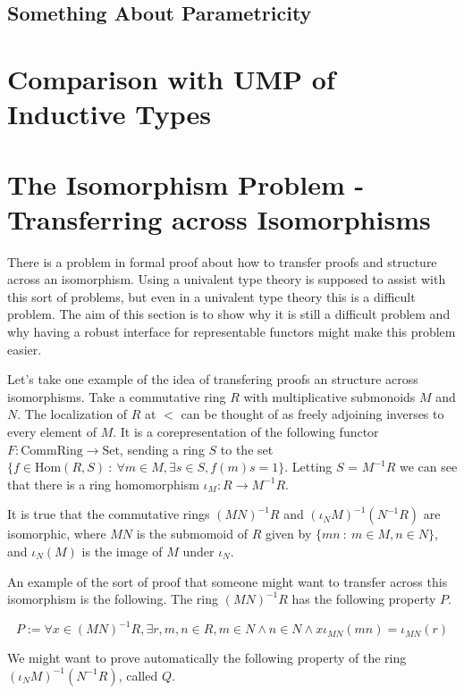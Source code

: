 \documentclass[12pt]{article} %
\theoremstyle{definition}
\theoremstyle{definition}
\theoremstyle{definition}
\theoremstyle{definition}
\begin{document}
\subsection{Something About Parametricity}

\section{Comparison with UMP of Inductive Types}

\section{The Isomorphism Problem - Transferring across Isomorphisms}

There is a problem in formal proof about how to transfer proofs and structure across an isomorphism. Using
a univalent type theory is supposed to assist with this sort of problems, but even in a univalent type theory this
is a difficult problem. The aim of this section is to show why it is still a difficult problem and why having
a robust interface for representable functors might make this problem easier.

Let's take one example of the idea of transfering proofs an structure across isomorphisms. Take a commutative
ring $R$ with multiplicative submonoids $M$ and $N$. The localization of $R$ at $<$ can be thought of as freely
adjoining inverses to every element of $M$. It is a corepresentation of the following functor
$F : \text{CommRing} \to \text{Set}$, sending a ring $S$ to the set
$\{ f \in \text{Hom}(R, S) \ : \ \forall m \in M, \exists s \in S, f(m)s = 1 \}$.
Letting $S$ = $M^{-1}R$ we can see that there is a ring homomorphism $\iota_M : R \to M^{-1}R$.

It is true that the commutative rings $(MN)^{-1}R$ and $(\iota_N M)^{-1}(N^{-1}R)$ are isomorphic,
where $MN$ is the submomoid of $R$ given by $\{ mn \ : \ m \in M, n \in N \}$, and $\iota_N(M)$ is the
image of $M$ under $\iota_N$.

An example of the sort of proof that someone might want to transfer across this isomorphism is the
following. The ring $(MN)^{-1}R$ has the following property $P$.

\begin{equation}
  P := \forall x \in (MN)^{-1}R, \exists r, m, n \in R, m \in N \wedge n \in N \wedge x\iota_{MN}(mn) = \iota_{MN}(r)
\end{equation}

We might want to prove automatically the following property of the ring $(\iota_N M)^{-1}(N^{-1}R)$, called $Q$.
\end{document}
